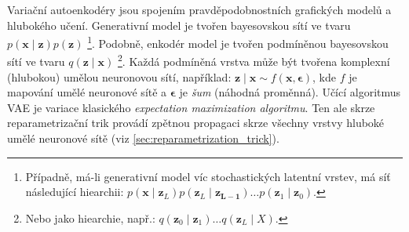 Variační autoenkodéry jsou spojením pravděpodobnostních grafických modelů a hlubokého učení.
Generativní model je tvořen bayesovskou sítí ve tvaru $p(\mathbf{x}\mid\mathbf{z})p(\mathbf{z})$
\footnote{Případně, má-li generativní model víc stochastických latentní vrstev, má síť následující hiearchii: $p(\mathbf{x}\mid\mathbf{z}_L) p(\mathbf{z}_L\mid\mathbf{z_{L-1}}) \dots p(\mathbf{z}_1\mid\mathbf{z}_0)$.}.
Podobně, enkodér model je tvořen podmíněnou bayesovskou sítí ve tvaru $q(\mathbf{z}\mid\mathbf{x})$
\footnote{Nebo jako hiearchie, např.: $q(\mathbf{z}_0\mid\mathbf{z}_1) \dots q(\mathbf{z}_L \mid X)$.}.
Každá podmíněná vrstva může být tvořena komplexní (hlubokou) umělou neuronovou sítí, například: $\mathbf{z}\mid\mathbf{x} \sim f(\mathbf{x}, \mathbf{\epsilon})$, kde $f$ je mapování umělé neuronové sítě a $\mathbf{\epsilon}$ je \emph{šum} (náhodná proměnná).
Učící algoritmus VAE je variace klasického \emph{expectation maximization algoritmu}. Ten ale skrze reparametrizační trik provádí zpětnou propagaci skrze všechny vrstvy hluboké umělé neuronové sítě (viz \autoref{sec:reparametrization_trick}).

